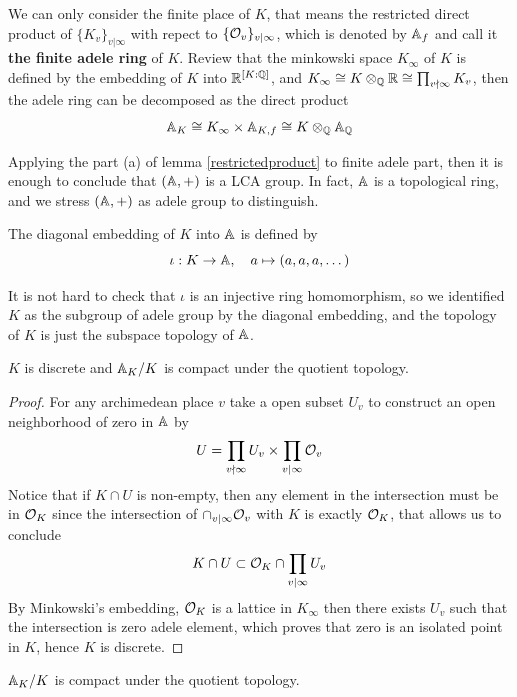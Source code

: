 We can only consider the finite place of \(K\), that means the restricted direct product of \(\{K_v\}_{v | \infty}\) with repect to \(\{\mathcal{O}_v\}_{v | \infty}\), which is denoted by \(\mathbb{A}_{f}\) and call it \textbf{the finite adele ring} of \(K\). Review that the minkowski space \(K_{\infty}\) of \(K\) is defined by the embedding of \(K\) into \(\mathbb{R}^{[K:\mathbb{Q}]}\), and \(K_{\infty } \cong K \otimes_{\mathbb{Q}} \mathbb{R} \cong \prod_{v \nmid \infty} K_v\), then the adele ring can be decomposed as the direct product
\[\mathbb{A}_K \cong K_{\infty} \times \mathbb{A}_{K,f} \cong K \otimes_{\mathbb{Q}} \mathbb{A}_{\mathbb{Q}}\] 

Applying the part (a) of lemma \ref{restrictedproduct} to finite adele part, then it is enough to conclude that \((\mathbb{A},+)\) is a LCA group. In fact, \(\mathbb{A}\) is a topological ring, and we stress \((\mathbb{A},+)\) as adele group to distinguish.

\begin{definition}
    The diagonal embedding of \(K\) into \(\mathbb{A}\) is defined by
    \[\iota: K \to \mathbb{A}, \quad a \mapsto (a,a,a,\dots)\]
\end{definition}

It is not hard to check that \(\iota\) is an injective ring homomorphism, so we identified \(K\) as the subgroup of adele group by the diagonal embedding, and the topology of \(K\) is just the subspace topology of \(\mathbb{A}\).

\begin{lemma}
    \(K\) is discrete and \(\mathbb{A}_K/K\) is compact under the quotient topology.
\end{lemma}

\begin{proof}
    For any archimedean place \(v\) take a open subset \(U_v\) to construct an open neighborhood of zero in \(\mathbb{A}\) by
    \[U = \prod_{v \nmid \infty}U_v \times \prod_{v \mid \infty}\mathcal{O}_v\]
    Notice that if \(K \cap U \) is non-empty, then any element in the intersection must be in \(\mathcal{O}_K\) since the intersection of \(\cap_{v \mid \infty}\mathcal{O}_v\) with \(K\) is exactly \(\mathcal{O}_K\), that allows us to conclude
    \[K \cap U \subset \mathcal{O}_K \cap \prod_{v \mid \infty}U_v\]
    By Minkowski's embedding, \(\mathcal{O}_K\) is a lattice in \(K_{\infty}\) then there exists \(U_v\) such that the intersection is zero adele element, which proves that zero is an isolated point in \(K\), hence \(K\) is discrete. 
\end{proof}


\begin{lemma}
    \(\mathbb{A}_K/K\) is compact under the quotient topology.
\end{lemma}

